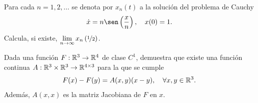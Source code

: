 \documentclass[12pt]{article}
\begin{document}
    \begin{ejercicio}
        Para cada $n = 1, 2, \dots$ se denota por $x_n(t)$ a la solución del problema de Cauchy
        \[
        \dot{x} = n \sen\left(\frac{x}{n}\right), \quad x(0) = 1.
        \]
        Calcula, si existe, $\lim\limits_{n \to \infty} x_n\left(\nicefrac{1}{2}\right)$.
    \end{ejercicio}

    \begin{ejercicio}
        Dada una función $F : \mathbb{R}^3 \to \mathbb{R}^4$ de clase $C^1$, demuestra que existe una función continua $A : \mathbb{R}^3 \times \mathbb{R}^3 \to \mathbb{R}^{4 \times 3}$ para la que se cumple
        \[
        F(x) - F(y) = A(x, y)(x - y), \quad \forall x, y \in \mathbb{R}^3.
        \]
        Además, $A(x, x)$ es la matriz Jacobiana de $F$ en $x$.
    \end{ejercicio}

    \newpage
    \setcounter{ejercicio}{0} %
\end{document}
